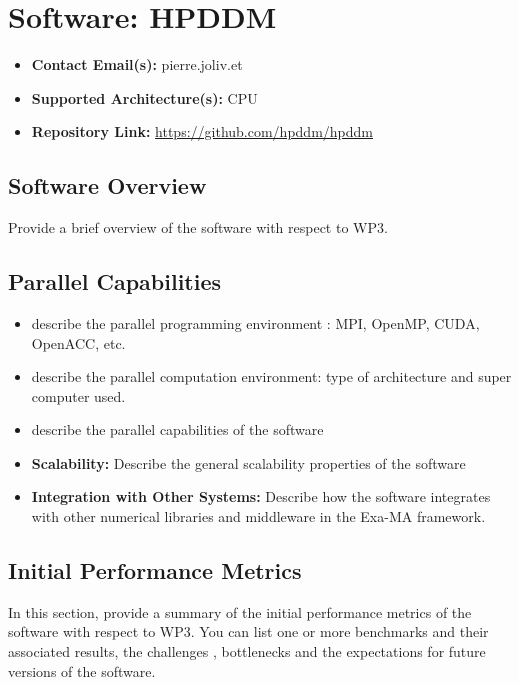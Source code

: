 \section{Software: HPDDM}
\label{sec:WP3:HPDDM:software}

\begin{itemize}
    \item \textbf{Contact Email(s):} pierre.joliv.et
    \item \textbf{Supported Architecture(s):} CPU
    \item \textbf{Repository Link:} \href{https://github.com/hpddm/hpddm}{https://github.com/hpddm/hpddm}
\end{itemize}

\subsection{Software Overview}
\label{sec:WP3:HPDDM:summary}

Provide a brief overview of the software with respect to WP3.

\subsection{Parallel Capabilities}
\label{sec:WP3:HPDDM:performances}


\begin{itemize}
    \item describe the parallel programming  environment : MPI, OpenMP, CUDA, OpenACC, etc.
    \item describe the parallel computation environment: type of architecture and super computer used.
    \item describe the parallel capabilities of the software
    \item \textbf{Scalability:} Describe the general scalability properties of the software
    \item \textbf{Integration with Other Systems:} Describe how the software integrates with other numerical libraries and middleware in the Exa-MA framework.
\end{itemize}

\subsection{Initial Performance Metrics}
\label{sec:WP3:HPDDM:metrics}

In this section, provide a summary of the initial performance metrics of the software with respect to WP3.
You can list one or more benchmarks and their associated results, the challenges , bottlenecks and the expectations for future versions of the software.



